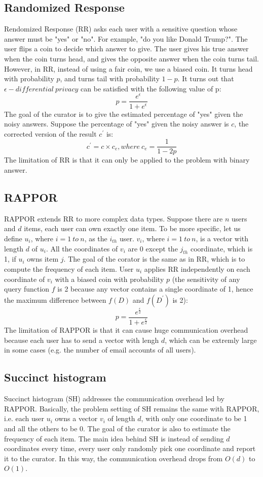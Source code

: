 \documentclass[a4paper, 11pt]{article} %
\begin{document}
\subsection{Randomized Response}
Rendomized Response (RR)\cite{erlingsson2014rappor} asks each user with a sensitive question whose answer must be "yes" or "no". For example, "do you like Donald Trump?". The user flips a coin to decide which answer to give. The user gives his true answer when the coin turns head, and gives the opposite answer when the coin turns tail. However, in RR, instead of using a fair coin, we use a biased coin. It turns head with probability $p$, and turns tail with probability $1-p$. It turns out that $\epsilon - differential \ privacy$ can be satisfied with the following value of p:
\[ p = \frac{e^\epsilon}{1+e^\epsilon} \]
The goal of the curator is to give the estimated percentage of "yes" given the noisy answers. Suppose the percentage of "yes" given the noisy answer is $c$, the corrected version of the result $c^\prime$ is:
\[ c^\prime = c \times c_{e}, where \ c_{e} = \frac{1}{1-2p}\]
The limitation of RR is that it can only be applied to the problem with binary answer.
\subsection{RAPPOR}
RAPPOR\cite{erlingsson2014rappor,fanti2016building} extends RR\cite{erlingsson2014rappor} to more complex data types. Suppose there are $n$ users and $d$ items, each user can own exactly one item. To be more specific, let us define $u_i$, where $i=1 \ to \ n$, as the $i_{th}$ user. $v_i$, where $i=1 \ to \ n$, is a vector with length $d$ of $u_i$. All the coordinates of $v_i$ are 0 except the $j_{th}$ coordinate, which is 1, if $u_i$ owns item $j$. The goal of the corator is the same as in RR, which is to compute the frequency of each item. User $u_i$ applies RR independently on each coordinate of $v_i$ with a biased coin with probability $p$ (the sensitivity of any query function $f$ is 2 because any vector contains a single coordinate of 1, hence the maximum difference between $f(D)$ and $f(D^\prime)$ is 2):
\[ p = \frac{e^{\frac{\epsilon}{2}}}{1+e^{\frac{\epsilon}{2}}} \]
The limitation of RAPPOR is that it can cause huge communication overhead because each user has to send a vector with lengh $d$, which can be extremly large in some cases (e.g. the number of email accounts of all users).

\subsection{Succinct histogram}
Succinct histogram (SH)\cite{bassily2015local} addresses the communication overhead led by RAPPOR\cite{erlingsson2014rappor,fanti2016building}. Basically, the problem setting of SH remains the same with RAPPOR, i.e. each user $u_i$ owns a vector $v_i$ of length $d$, with only one coordinate to be 1 and all the others to be 0. The goal of the curator is also to estimate the frequency of each item. The main idea behind SH is instead of sending $d$ coordinates every time, every user only randomly pick one coordinate and report it to the curator. In this way, the communication overhead drops from $O(d)$ to $O(1)$.
\end{document}
